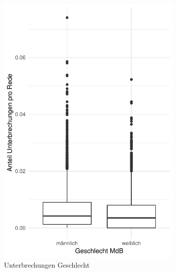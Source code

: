 \documentclass[12pt, 
    twoside=false, 
    bibliography=totoc, 
    numbers=endperiod, 
    headings=normal, 
    toc=chapterentrydotfill
    ]{scrbook}
\begin{document}
\begin{figure}[H]
    \centering
    \begin{subfigure}{.5\textwidth}
      \centering
      \includegraphics[width=.9\linewidth]{images/boxplot_unterbrechung_geschlecht.pdf}
      \caption{Unterbrechungen Geschlecht}
      \label{fig:boxplot_unterbrechung_geschlecht}
    \end{subfigure}%
    \begin{subfigure}{.5\textwidth}
      \centering

\end{subfigure}
\end{figure}
\end{document}
